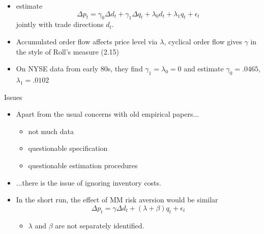 \documentclass[english,10pt
,aspectratio=169
]{beamer}
\begin{document}
\begin{frame}{\cite{glosten_estimating_1988}}
	\begin{itemize}
		\item \textbf{\cite{glosten_estimating_1988}} estimate
		\begin{equation} \tag{5.7}
			\Delta p_t = \gamma_0 \Delta d_t+ \gamma_1 \Delta q_t + \lambda_0 d_t + \lambda_1 q_t + \epsilon_t
		\end{equation}
		jointly with trade directions $d_t$. 
		\item Accumulated order flow affects price level via $\lambda$, cyclical order flow gives $\gamma$ in the style of Roll's measure (2.15)
		\item On NYSE data from early 80s, they find $\gamma_1=\lambda_0=0$ and estimate $\gamma_0=.0465$, $\lambda_1=.0102$
	\end{itemize}
\end{frame}


\begin{frame}{Issues}
	\begin{itemize}
		\item Apart from the usual concerns with old empirical papers...
		\begin{itemize}
			\item not much data
			\item questionable specification
			\item questionable estimation procedures
		\end{itemize}
		\item ...there is the issue of ignoring inventory costs.
		\item In the short run, the effect of MM risk aversion would be similar
		\begin{equation} \tag{5.14}
		\Delta p_t = \gamma \Delta d_t + (\lambda + \beta) q_t + \epsilon_t
		\end{equation}
		\begin{itemize}
			\item $\lambda$ and $\beta$ are not separately identified.
		\end{itemize}
	\end{itemize}
\end{frame}
\end{document}

